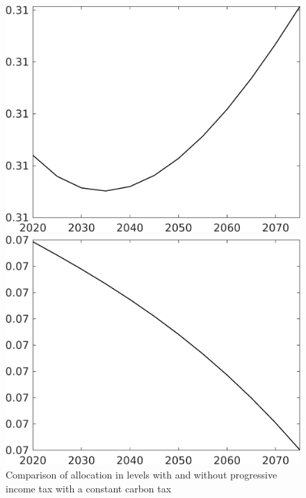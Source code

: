 \begin{figure}[h!!]
	\centering
	\caption{Comparison of allocation in levels with and without progressive income tax with a constant carbon tax}		\label{fig:Efftaul_nsk0_xgr0_know_app}		
	\begin{minipage}[]{0.32\textwidth}
		\includegraphics[width=1\textwidth]{../../codding_model/own_basedOnFried/optimalPol_010922_revision/figures/all_13Sept22/CompTaufPER_bytaul_Reg0_sff_spillover0_nsk0_xgr0_knspil0_sep0_LFlimit0_emsbase0_countec0_GovRev0_etaa0.79_lgd0.png}
	\end{minipage}	
\begin{minipage}[]{0.32\textwidth}
\includegraphics[width=1\textwidth]{../../codding_model/own_basedOnFried/optimalPol_010922_revision/figures/all_13Sept22/CompTaufPER_bytaul_Reg0_sg_spillover0_nsk0_xgr0_knspil0_sep0_LFlimit0_emsbase0_countec0_GovRev0_etaa0.79_lgd0.png}

\end{minipage}
\end{figure}
